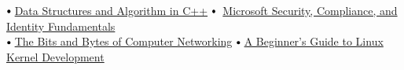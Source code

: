 \documentclass[letterpaper,11pt]{article}
\newcommand\sbullet[1][.5]{\mathbin{\vcenter{\hbox{\scalebox{#1}{$\bullet$}}}}}
\begin{document}
$\sbullet[.75] \hspace{0.1cm}${\href{https://drive.google.com/file/d/1ybKHwlwKULWFYWAcgobCxv4q2JkYjg-Q/view?usp=sharing}{Data Structures and Algorithm in C++}}\hspace{0.6cm}
$\sbullet[.75] \hspace{0.2cm}${\href{https://www.credly.com/earner/earned/badge/d2e4e5d7-478e-4132-935a-d99d64b605ef} {Microsoft Security, Compliance, and Identity Fundamentals}}\hspace{0.6cm}
\\

$\sbullet[.75] \hspace{0.1cm}${\href{https://www.coursera.org/account/accomplishments/verify/J6Y3LE33PME6?utm_source=link&utm_medium=certificate&utm_content=cert_image&utm_campaign=sharing_cta&utm_product=course}{The Bits and Bytes of Computer Networking}}\hspace{1cm}
$\sbullet[.75] \hspace{0.1cm}${\href{https://www.credly.com/earner/earned/badge/af275507-02fa-40df-95aa-08ec062e9927}{A Beginner's Guide to Linux Kernel Development}} 
\end{document}
